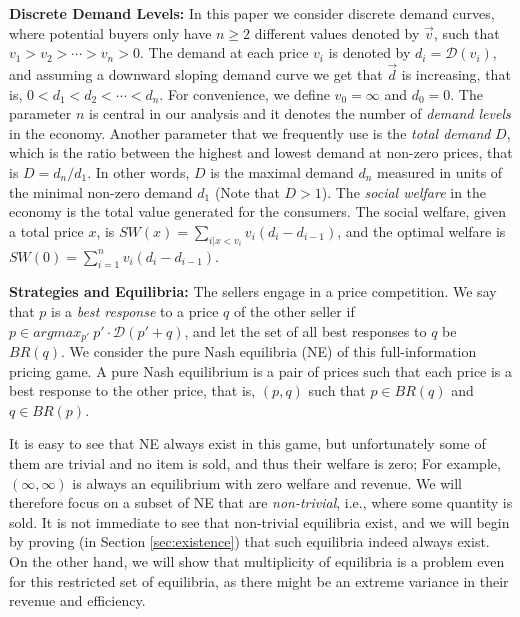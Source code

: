 \documentclass[11pt,a4paper]{article}
\begin{document}
\noindent \textbf{Discrete Demand Levels:}
In this paper we consider discrete demand curves, where potential buyers only have $n\geq 2$ different values denoted by $\vec{v}$, such that $v_1 > v_2 > \cdots > v_n>0$.
The demand at each price $v_i$ is denoted by $d_i=\mathcal{D}(v_i)$, and assuming a downward sloping demand curve we get that $\vec{d}$ is increasing, that is,
$0<d_1<d_2<\cdots<d_n$.
For convenience, we define $v_0=\infty$ and $d_0=0$.
The parameter $n$ is central in our analysis and
it denotes the number of \emph{demand levels} in the economy.
Another parameter that we frequently use is the
\emph{total demand} $D$, which is the ratio between the highest and lowest demand at non-zero prices, that is $D=d_n/d_1$.
In other words, $D$ is
the maximal demand $d_n$ measured in units of the minimal non-zero demand $d_1$ (Note that $D>1$).
The \emph{social welfare} in the economy is the total value generated for the consumers. The social welfare, given a total price $x$, is
 $SW(x)= \sum_{i | x<v_{i}} v_i (d_{i}-d_{i-1})$, and the optimal welfare is $SW(0)=\sum_{i=1}^{n} v_i (d_{i}-d_{i-1})$.

\vspace{2mm}

\noindent \textbf{Strategies and Equilibria:}
The sellers engage in a price competition.
We say that $p$ is a \emph{best response} to a price $q$ of the other seller if $p\in  argmax_{p'} \  p'\cdot \mathcal{D}(p'+q)$, and let the set of all best responses to $q$ be $BR(q)$.
We consider the pure Nash equilibria (NE) of this full-information pricing game.
A pure Nash equilibrium is a pair of prices such that each price is a best response to the other price, that is, $(p,q)$  such that  $p\in BR(q)$ and $q\in BR(p)$.

It is easy to see that NE always exist in this game, but unfortunately some of them are trivial and no item is sold, and thus their welfare is zero;
For example, $(\infty,\infty)$ is always an equilibrium with zero welfare and revenue.
We will therefore focus on a subset of NE that are {\em non-trivial}, i.e., where some quantity is sold.
It is not immediate to see that non-trivial %
equilibria exist, and we will begin by proving (in Section \ref{sec:existence}) that such equilibria indeed always exist.
On the other hand, we will show that
multiplicity of equilibria is a problem even for this restricted set of equilibria, as there might be an extreme variance in their revenue and efficiency.
\end{document}
